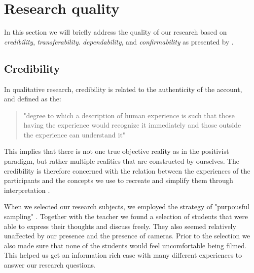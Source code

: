 



\section{Research quality}
In this section we will briefly address the quality of our research based on \emph{credibility}, \emph{transferability}. \emph{dependability}, and \emph{confirmability} as presented by \citet{baxter1997evaluating}.

\subsection{Credibility}
In qualitative research, credibility is related to the authenticity of the account, and defined as the: \begin{quote}"degree to which a description of human experience is such that those having the experience would recognize it immediately and those outside the experience can understand it" \citetext{\citealp{lincoln1985naturalistic}, referenced in \citealp{baxter1997evaluating}}\end{quote}

This implies that there is not one true objective reality as in the positivist paradigm, but rather multiple realities that are constructed by ourselves. The credibility is therefore concerned with the relation between the experiences of the participants and the concepts we use to recreate and simplify them through interpretation \citep{baxter1997evaluating}.

When we selected our research subjects, we employed the strategy of "purpousful sampling" \citep{baxter1997evaluating}. Together with the teacher we found a selection of students that were able to express their thoughts and discuss freely. They also seemed relatively unaffected by our presence and the presence of cameras. Prior to the selection we also made sure that none of the students would feel uncomfortable being filmed. This helped us get an information rich case with many different experiences to answer our research questions. 

